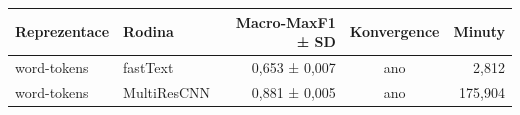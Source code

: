 \begin{tabular}{llrcr}
\toprule
Reprezentace & Rodina & Macro-MaxF1 ± SD & Konvergence & Minuty\\
\midrule
word-tokens & fastText & 0,653 ± 0,007 & ano & 2,812\\
word-tokens & MultiResCNN & 0,881 ± 0,005 & ano & 175,904\\
\bottomrule
\end{tabular}
